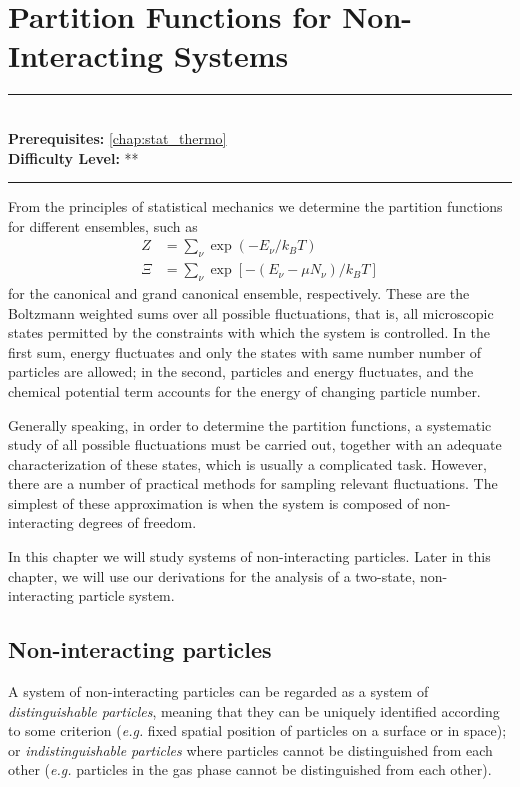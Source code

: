 \documentclass[book.tex]{subfiles}
\begin{document}
\chapter{Partition Functions for Non-Interacting Systems}
\label{chap:noninteracting}
\noindent\rule{11cm}{0.4pt} \\
\textbf{Prerequisites:}   \autoref{chap:stat_thermo}  \\
\textbf{Difficulty Level:} ** \\
\noindent\rule{11cm}{0.4pt}
\vspace{5mm}


From the principles of statistical mechanics we determine the partition functions for different ensembles, such as
\begin{align}
Z &=\sum_\nu \exp(-E_\nu/k_BT)\\
\Xi &= \sum_\nu \exp[-(E_\nu -\mu N_\nu)/k_BT]
\end{align}
for the canonical and grand canonical ensemble, respectively. These are the Boltzmann weighted sums over all possible fluctuations, that is, all microscopic states permitted by the constraints with which the system is controlled. In the first sum, energy fluctuates and only the states with same number number of particles are allowed; in the second, particles and energy fluctuates, and the chemical potential term accounts for the energy of changing particle number.

Generally speaking, in order to determine the partition functions, a systematic study of all possible fluctuations must be carried out, together with an adequate characterization of these states, which is usually a complicated task. However, there are a number of practical methods for sampling relevant fluctuations. The simplest of these approximation is when the system is composed of non-interacting degrees of freedom.

In this chapter we will study systems of non-interacting particles. Later in this chapter, we will use our derivations for the analysis of a two-state, non-interacting particle system.

\section{Non-interacting particles}

A system of non-interacting particles can be regarded as a system of \textit{distinguishable particles}, meaning that they can be uniquely identified according to some criterion (\textit{e.g.} fixed spatial position of particles on a surface or in space); or \textit{indistinguishable particles} where particles cannot be distinguished from each other (\textit{e.g.} particles in the gas phase cannot be distinguished from each other).
\end{document}
